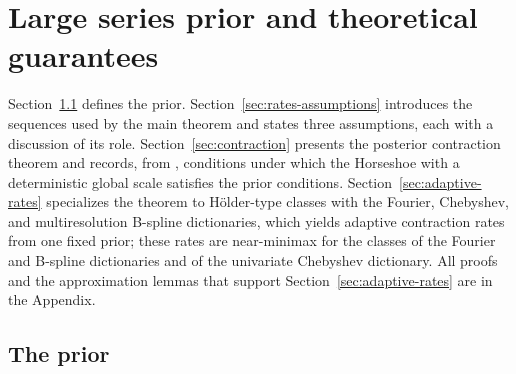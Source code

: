 \section{Large series prior and theoretical guarantees} \label{sec:method}

Section~\ref{sec:prior-def} defines the prior. Section~\ref{sec:rates-assumptions} introduces the sequences used by the main theorem and states three assumptions, each with a discussion of its role. Section~\ref{sec:contraction} presents the posterior contraction theorem and records, from \citet{WeiGhosal2020}, conditions under which the Horseshoe with a deterministic global scale satisfies the prior conditions. Section~\ref{sec:adaptive-rates} specializes the theorem to H\"older-type classes with the Fourier, Chebyshev, and multiresolution B-spline dictionaries, which yields adaptive contraction rates from one fixed prior; these rates are near-minimax for the classes of the Fourier and B-spline dictionaries and of the univariate Chebyshev dictionary. All proofs and the approximation lemmas that support Section~\ref{sec:adaptive-rates} are in the Appendix.

\subsection{The prior}\label{sec:prior-def}

